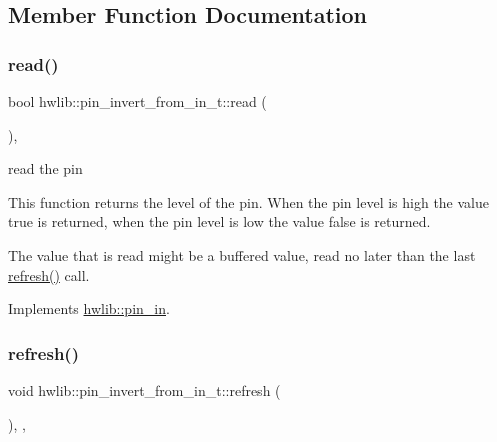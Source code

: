 \subsection{Member Function Documentation}
\mbox{\label{classhwlib_1_1pin__invert__from__in__t_a41050e62292c67a287bbd9fbce004b45}} 
\subsubsection{\texorpdfstring{read()}{read()}}
{\footnotesize\ttfamily bool hwlib\+::pin\+\_\+invert\+\_\+from\+\_\+in\+\_\+t\+::read (\begin{DoxyParamCaption}{ }\end{DoxyParamCaption})\hspace{0.3cm}{\ttfamily [inline]}, {\ttfamily [virtual]}}





read the pin

This function returns the level of the pin. When the pin level is high the value true is returned, when the pin level is low the value false is returned.

The value that is read might be a buffered value, read no later than the last \hyperlink{classhwlib_1_1pin__invert__from__in__t_a6361c3508dd5b7abcc4f6b4953710f95}{refresh()} call. 

Implements \hyperlink{classhwlib_1_1pin__in_ad071bd2e17bb4af51390f6cbb728a194}{hwlib\+::pin\+\_\+in}.

\mbox{\label{classhwlib_1_1pin__invert__from__in__t_a6361c3508dd5b7abcc4f6b4953710f95}} 
\subsubsection{\texorpdfstring{refresh()}{refresh()}}
{\footnotesize\ttfamily void hwlib\+::pin\+\_\+invert\+\_\+from\+\_\+in\+\_\+t\+::refresh (\begin{DoxyParamCaption}{ }\end{DoxyParamCaption})\hspace{0.3cm}{\ttfamily [inline]}, {\ttfamily [override]}, {\ttfamily [virtual]}}





